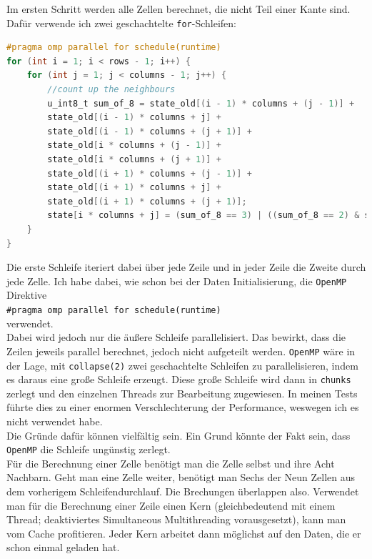 \documentclass[german,plainarticle,hyperref,utf8]{zihpub}
\begin{document}
	Im ersten Schritt werden alle Zellen berechnet, die nicht Teil einer Kante sind. Dafür verwende ich zwei geschachtelte \texttt{for}-Schleifen:\\
	\begin{lstlisting}[language=C, caption=Berechnung der inneren Zellen]
#pragma omp parallel for schedule(runtime)
for (int i = 1; i < rows - 1; i++) {
	for (int j = 1; j < columns - 1; j++) {
		//count up the neighbours
		u_int8_t sum_of_8 = state_old[(i - 1) * columns + (j - 1)] +
		state_old[(i - 1) * columns + j] +
		state_old[(i - 1) * columns + (j + 1)] +
		state_old[i * columns + (j - 1)] +
		state_old[i * columns + (j + 1)] +
		state_old[(i + 1) * columns + (j - 1)] +
		state_old[(i + 1) * columns + j] +
		state_old[(i + 1) * columns + (j + 1)];
		state[i * columns + j] = (sum_of_8 == 3) | ((sum_of_8 == 2) & state_old[i * columns + j]);
	}
}\end{lstlisting}
	
	Die erste Schleife iteriert dabei über jede Zeile und in jeder Zeile die Zweite durch jede Zelle. Ich habe dabei, wie schon bei der Daten Initialisierung, die \texttt{OpenMP} Direktive\\
	
	\texttt{\#pragma omp parallel for schedule(runtime)}\\
	
	verwendet.\\
	Dabei wird jedoch nur die äußere Schleife parallelisiert. Das bewirkt, dass die Zeilen jeweils parallel berechnet, jedoch nicht aufgeteilt werden. \texttt{OpenMP} wäre in der Lage, mit \texttt{collapse(2)} zwei geschachtelte Schleifen zu parallelisieren, indem es daraus eine große Schleife erzeugt. Diese große Schleife wird dann in \texttt{chunks} zerlegt und den einzelnen Threads zur Bearbeitung zugewiesen. In meinen Tests führte dies zu einer enormen Verschlechterung der Performance, weswegen ich es nicht verwendet habe.\\
	
	Die Gründe dafür können vielfältig sein. Ein Grund könnte der Fakt sein, dass \texttt{OpenMP} die Schleife ungünstig zerlegt.\\
	Für die Berechnung einer Zelle benötigt man die Zelle selbst und ihre Acht Nachbarn. Geht man eine Zelle weiter, benötigt man Sechs der Neun Zellen aus dem vorherigem Schleifendurchlauf. Die Brechungen überlappen also. Verwendet man für die Berechnung einer Zeile einen Kern (gleichbedeutend mit einem Thread; deaktiviertes Simultaneous Multithreading vorausgesetzt), kann man vom Cache profitieren. Jeder Kern arbeitet dann möglichst auf den Daten, die er schon einmal geladen hat.\\
	
\end{document}
